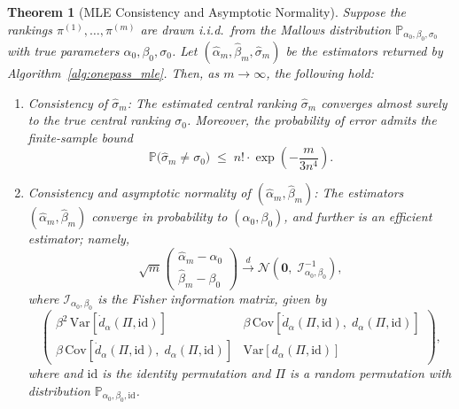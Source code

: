 \documentclass{article}
\renewcommand{\P}{\mathbb{P}}
\newtheorem{theorem}{Theorem}[section] %
\begin{document}
\begin{theorem}[MLE Consistency and Asymptotic Normality]\label{thm:main_mle}
Suppose the rankings \(\pi^{(1)}, \dots, \pi^{(m)}\) are drawn i.i.d.\ from the Mallows distribution \(\mathbb{P}_{\alpha_0, \beta_0, \sigma_0}\) with true parameters \(\alpha_0, \beta_0, \sigma_0\). Let \((\hat{\alpha}_m, \hat{\beta}_m, \hat{\sigma}_m)\) be the estimators returned by Algorithm~\ref{alg:onepass_mle}. Then, as \(m \to \infty\), the following hold:

\begin{enumerate}
    \item \textit{Consistency of \(\hat{\sigma}_m\):} The estimated central ranking $\hat\sigma_m$ converges almost surely to the true central ranking $\sigma_0$. Moreover, the probability of error admits the finite-sample bound
    \[
    \mathbb{P}\bigl( \hat{\sigma}_m \neq \sigma_0 \bigr)
    \;\le\;
    n! \cdot \exp\left( -\frac{m}{3n^4} \right).
    \]

    \item \textit{Consistency and asymptotic normality of \((\hat{\alpha}_m, \hat{\beta}_m)\):} The estimators \((\hat{\alpha}_m, \hat{\beta}_m)\) converge in probability to \((\alpha_0, \beta_0)\), and further is an efficient estimator; namely,
    \[
    \sqrt{m}
    \begin{pmatrix}
        \hat{\alpha}_m - \alpha_0 \\
        \hat{\beta}_m - \beta_0
    \end{pmatrix}
    \xrightarrow{d}
    \mathcal{N}\left(
        \mathbf{0},\;
        \mathcal I_{\alpha_0, \beta_0}^{-1}
    \right),
    \]
    where $\mathcal I_{\alpha_0, \beta_0}$ is the Fisher information matrix, given by
    \[
    \begin{pmatrix}
        \beta^2\, \mathrm{Var}[\dot{d}_\alpha(\Pi, \text{id})] &
        \beta\, \mathrm{Cov} [\dot{d}_\alpha(\Pi, \text{id}), \; d_\alpha(\Pi, \text{id})] \\[6pt]
        \beta\, \mathrm{Cov}[\dot{d}_\alpha(\Pi, \text{id}), \; d_\alpha(\Pi, \text{id})] &
        \mathrm{Var}[d_\alpha(\Pi, \text{id})]
    \end{pmatrix},
    \]
    where and $\text{id}$ is the identity permutation and $\Pi$ is a random permutation with distribution $\P_{\alpha_0,\beta_0, \text{id}}$.
\end{enumerate}
\end{theorem}
\end{document}
